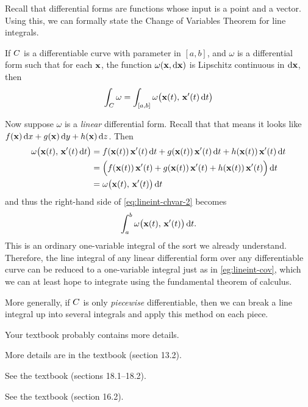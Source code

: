 Recall that differential forms are functions whose input is a point and a vector.
Using this, we can formally state the Change of Variables Theorem for line integrals.

\begin{thm}
  If $\curve$ is a differentiable curve with parameter in $[a,b]$, and $\omega$ is a differential form such that for each $\ptx$, the function $\omega(\ptx,\dpx)$ is Lipschitz continuous in $\dpx$, then
  \begin{equation}
    \lint{\curve} \omega = \lint{[a,b]} \omega\big(\curvept(t),\, \curvept'(t) \,\dt\big)\label{eq:lineint-chvar-2}
  \end{equation}
\end{thm}

Now suppose $\omega$ is a \emph{linear} differential form.
Recall that that means it looks like $f(\ptx)\,\dx + g(\ptx)\,\dy + h(\ptx)\,\dz$.
Then
\begin{align*}
  \omega\big(\curvept(t),\, \curvept'(t) \,\dt\big) &=
  f(\curvept(t))\,\curvept'(t) \,\dt + g(\curvept(t))\,\curvept'(t) \,\dt + h(\curvept(t))\,\curvept'(t) \,\dt\\
  &= \Big(f(\curvept(t))\,\curvept'(t) + g(\curvept(t))\,\curvept'(t) + h(\curvept(t))\,\curvept'(t)\Big) \,\dt\\
  &= \omega\big(\curvept(t),\, \curvept'(t)\big)\,\dt
\end{align*}
and thus the right-hand side of \cref{eq:lineint-chvar-2} becomes
\[ \itint t a b {\omega\big(\curvept(t),\, \curvept'(t)\big)}. \]
This is an ordinary one-variable integral of the sort we already understand.
Therefore, the line integral of any linear differential form over any differentiable curve can be reduced to a one-variable integral just as in \cref{eg:lineint-cov}, which we can at least hope to integrate using the fundamental theorem of calculus.

More generally, if $\curve$ is only \emph{piecewise} differentiable, then we can break a line integral up into several integrals and apply this method on each piece.
\begin{notextbook}Your textbook probably contains more details.\end{notextbook}%
\begin{stewart}More details are in the textbook (section 13.2).\end{stewart}%
\begin{hugheshallett}See the textbook (sections 18.1--18.2).\end{hugheshallett}%
\begin{rogawski}See the textbook (section 16.2).\end{rogawski}%

